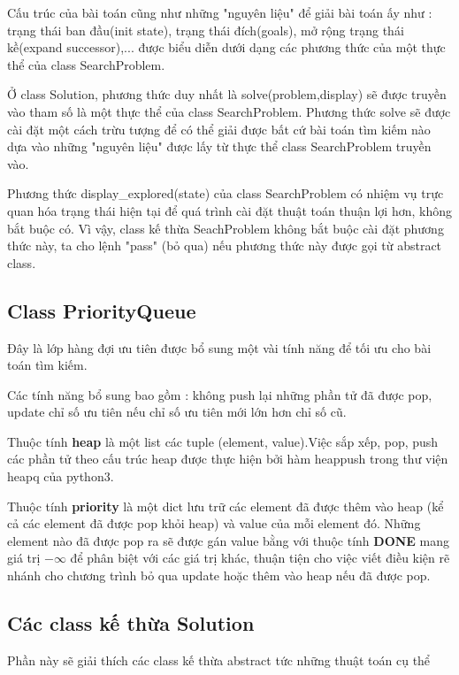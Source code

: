 \documentclass[11pt]{scrartcl} %
\begin{document}
Cấu trúc của bài toán cũng như những "nguyên liệu" để giải bài toán ấy như : trạng thái ban đầu(init state), trạng thái đích(goals), mở rộng trạng thái kề(expand successor)\cite{csttnt_lhb},... được biểu diễn dưới dạng các phương thức của một thực thể của class SearchProblem. 

Ở class Solution, phương thức duy nhất là solve(problem,display) sẽ được truyền vào tham số là một thực thể của class SearchProblem. Phương thức solve sẽ được cài đặt một cách trừu tượng để có thể giải được bất cứ bài toán tìm kiếm nào dựa vào những "nguyên liệu" được lấy từ thực thể class SearchProblem truyền vào.

Phương thức display\_explored(state) của class SearchProblem có nhiệm vụ trực quan hóa trạng thái hiện tại để quá trình cài đặt thuật toán thuận lợi hơn, không bắt buộc có. Vì vậy, class kế thừa SeachProblem không bắt buộc cài đặt phương thức này, ta cho lệnh "pass" (bỏ qua) nếu phương thức này được gọi từ abstract class.

\subsection{Class PriorityQueue}
Đây là lớp hàng đợi ưu tiên được bổ sung một vài tính năng để tối ưu cho bài toán tìm kiếm.

Các tính năng bổ sung bao gồm : không push lại những phần tử đã được pop, update chỉ số ưu tiên nếu chỉ số ưu tiên mới lớn hơn chỉ số cũ. 


Thuộc tính \textbf{heap} là một list các tuple (element, value).Việc sắp xếp, pop, push các phần tử theo cấu trúc heap được thực hiện bởi hàm heappush trong thư viện heapq của python3.

Thuộc tính \textbf{priority} là một dict lưu trữ các element đã được thêm vào heap (kể cả các element đã được pop khỏi heap) và value của mỗi element đó. Những element nào đã được pop ra sẽ được gán value bằng với thuộc tính \textbf{DONE} mang giá trị $- \infty$ để phân biệt với các giá trị khác, thuận tiện cho việc viết điều kiện rẽ nhánh cho chương trình bỏ qua update hoặc thêm vào heap nếu đã được pop.
\subsection{Các class kế thừa Solution}
Phần này sẽ giải thích các class kế thừa abstract tức những thuật toán cụ thể
\end{document}
